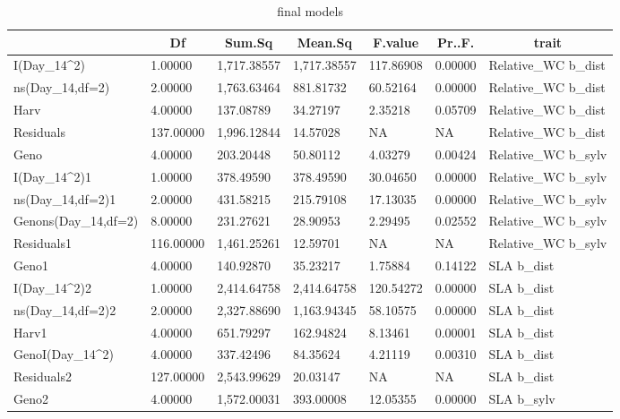 \documentclass[jou,floatsintext]{apa6}
\begin{document}
\begin{table}[tbp]
\begin{center}
\begin{threeparttable}
\caption{\label{tab:outmodels}final models}
\tiny{
\begin{tabular}{lllllll}
\toprule
 & \multicolumn{1}{c}{Df} & \multicolumn{1}{c}{Sum.Sq} & \multicolumn{1}{c}{Mean.Sq} & \multicolumn{1}{c}{F.value} & \multicolumn{1}{c}{Pr..F.} & \multicolumn{1}{c}{trait}\\
\midrule
I(Day\_14\textasciicircum{}2) & 1.00000 & 1,717.38557 & 1,717.38557 & 117.86908 & 0.00000 & Relative\_WC b\_dist\\
ns(Day\_14,df=2) & 2.00000 & 1,763.63464 & 881.81732 & 60.52164 & 0.00000 & Relative\_WC b\_dist\\
Harv & 4.00000 & 137.08789 & 34.27197 & 2.35218 & 0.05709 & Relative\_WC b\_dist\\
Residuals & 137.00000 & 1,996.12844 & 14.57028 & NA & NA & Relative\_WC b\_dist\\
Geno & 4.00000 & 203.20448 & 50.80112 & 4.03279 & 0.00424 & Relative\_WC b\_sylv\\
I(Day\_14\textasciicircum{}2)1 & 1.00000 & 378.49590 & 378.49590 & 30.04650 & 0.00000 & Relative\_WC b\_sylv\\
ns(Day\_14,df=2)1 & 2.00000 & 431.58215 & 215.79108 & 17.13035 & 0.00000 & Relative\_WC b\_sylv\\
Genons(Day\_14,df=2) & 8.00000 & 231.27621 & 28.90953 & 2.29495 & 0.02552 & Relative\_WC b\_sylv\\
Residuals1 & 116.00000 & 1,461.25261 & 12.59701 & NA & NA & Relative\_WC b\_sylv\\
Geno1 & 4.00000 & 140.92870 & 35.23217 & 1.75884 & 0.14122 & SLA b\_dist\\
I(Day\_14\textasciicircum{}2)2 & 1.00000 & 2,414.64758 & 2,414.64758 & 120.54272 & 0.00000 & SLA b\_dist\\
ns(Day\_14,df=2)2 & 2.00000 & 2,327.88690 & 1,163.94345 & 58.10575 & 0.00000 & SLA b\_dist\\
Harv1 & 4.00000 & 651.79297 & 162.94824 & 8.13461 & 0.00001 & SLA b\_dist\\
GenoI(Day\_14\textasciicircum{}2) & 4.00000 & 337.42496 & 84.35624 & 4.21119 & 0.00310 & SLA b\_dist\\
Residuals2 & 127.00000 & 2,543.99629 & 20.03147 & NA & NA & SLA b\_dist\\
Geno2 & 4.00000 & 1,572.00031 & 393.00008 & 12.05355 & 0.00000 & SLA b\_sylv\\

\end{tabular}}
\end{threeparttable}
\end{center}
\end{table}
\end{document}

